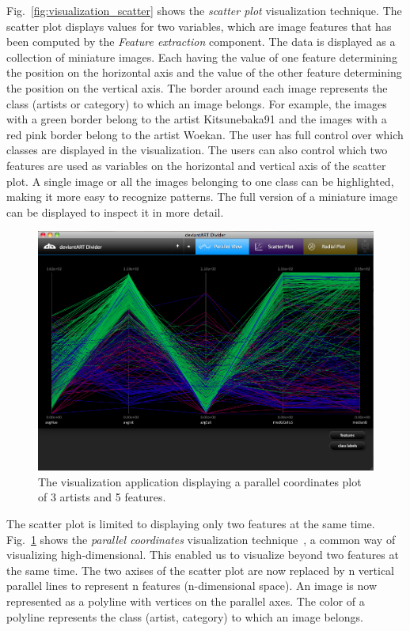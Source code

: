 Fig.~\ref{fig:visualization_scatter} shows the \textit{scatter plot} visualization technique.
The scatter plot displays values for two variables, which are image features that has been computed by the \textit{Feature extraction} component.
The data is displayed as a collection of miniature images.
Each having the value of one feature determining the position on the horizontal axis and the value of the other feature determining the position on the vertical axis.
The border around each image represents the class (artists or category) to which an image belongs.
For example, the images with a green border belong to the artist Kitsunebaka91 and the images with a red pink border belong to the artist Woekan.
The user has full control over which classes are displayed in the visualization.
The users can also control which two features are used as variables on the horizontal and vertical axis of the scatter plot.
A single image or all the images belonging to one class can be highlighted, making it more easy to recognize patterns.
The full version of a miniature image can be displayed to inspect it in more detail.

\begin{figure}[htb]
  \centering
  \includegraphics[width=1\linewidth]{img/visualization_parallel.png}
  \caption{The visualization application displaying a parallel coordinates plot of 3 artists and 5 features.}
  \label{fig:visualization_parallel}
\end{figure}

The scatter plot is limited to displaying only two features at the same time.
Fig.~\ref{fig:visualization_parallel} shows the \textit{parallel coordinates} visualization technique~\cite{andrienko2001constructing}, a common way of visualizing high-dimensional.
This enabled us to visualize beyond two features at the same time.
The two axises of the scatter plot are now replaced by n vertical parallel lines to represent n features (n-dimensional space).
An image is now represented as a polyline with vertices on the parallel axes.
The color of a polyline represents the class (artist, category) to which an image belongs.

